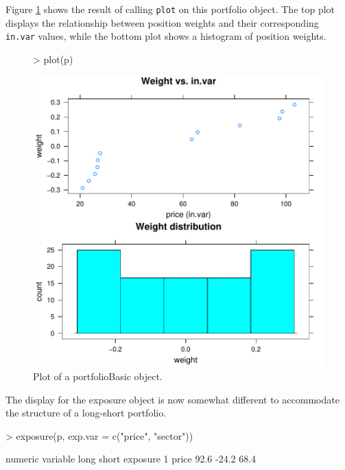 \documentclass[a4paper]{report}
\begin{document}
\begin{article}
Figure \ref{figure:plot.portfolio} shows the result of calling
\texttt{plot} on this portfolio object.  The top plot displays the
relationship between position weights and their corresponding
\texttt{in.var} values, while the bottom plot shows a histogram of
position weights.

\begin{figure}
\centering
\vspace*{.1in}
\begin{Schunk}
\begin{Sinput}
> plot(p)
\end{Sinput}
\end{Schunk}
\includegraphics{portfolio-010}
\caption{\label{figure:plot.portfolio}
Plot of a portfolioBasic object.}
\end{figure}

The display for the exposure object is now somewhat different to
accommodate the structure of a long-short portfolio. 

\begin{Schunk}
\begin{Sinput}
> exposure(p, exp.var = c("price", "sector"))
\end{Sinput}
\begin{Soutput}
numeric 
  variable long short exposure
1    price 92.6 -24.2     68.4


\end{Soutput}
\end{Schunk}
\end{article}
\end{document}
